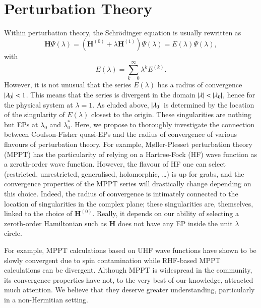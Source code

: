 \documentclass[aps,prb,reprint,noshowkeys,superscriptaddress]{revtex4-1}
\newcommand{\bH}{\mathbf{H}}
\begin{document}
\section{Perturbation Theory}

Within perturbation theory, the Schr\"odinger equation is usually rewritten as 
\begin{equation}
	\bH \Psi(\lambda) = (\bH^{(0)} + \lambda \bH^{(1)} ) \Psi(\lambda) = E(\lambda) \Psi(\lambda),
\end{equation}
with
\begin{equation}
	E(\lambda) = \sum_{k=0}^\infty \lambda^k E^{(k)}.
\end{equation}
However, it is not unusual that the series $E(\lambda)$ has a radius of convergence $\abs{\lambda_0} < 1$. 
This means that the series is divergent in the domain $\abs{\lambda} < \abs{\lambda_0}$, hence for the physical system at $\lambda = 1$.
As eluded above, $\abs{\lambda_0}$ is determined by the location of the singularity of $E(\lambda)$ closest to the origin.
These singularities are nothing but EPs at $\lambda_0$ and $\lambda_0^*$.
Here, we propose to thoroughly investigate the connection between Coulson-Fisher quasi-EPs and the radius of convergence of various flavours of perturbation theory.
For example, M{\o}ller-Plesset perturbation theory (MPPT) has the particularity of relying on a Hartree-Fock (HF) wave function as a zeroth-order wave function.
However, the flavour of HF one can select (restricted, unrestricted, generalised, holomorphic, \ldots) is up for grabs, and the convergence properties of the MPPT series will drastically change depending on this choice.
Indeed, the radius of convergence is intimately connected to the location of singularities in the complex plane; these singularities are, themselves, linked to the choice of $\bH^{(0)}$. 
Really, it depends on our ability of selecting a zeroth-order Hamiltonian such as $\bH$ does not have any EP inside the unit $\lambda$ circle.

For example, MPPT calculations based on UHF wave functions have shown to be slowly convergent due to spin contamination while RHF-based MPPT calculations can be divergent. \cite{Gill_1986, Gill_1988}
Although MPPT is widespread in the community, its convergence properties have not, to the very best of our knowledge, attracted much attention. \cite{Olsen_1996, Olsen_2000, Goodson_2012}
We believe that they deserve greater understanding, particularly in a non-Hermitian setting.
\end{document}
